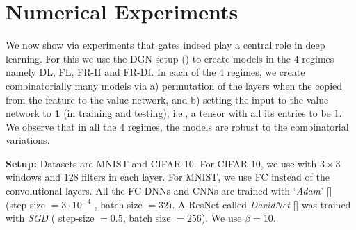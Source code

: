 \section{Numerical Experiments}\label{sec:exp} 
We  now show via experiments that gates indeed play a central role in deep learning. For this we use the DGN setup () to create models in the $4$ regimes namely DL, FL, FR-II and FR-DI. In each of the $4$ regimes, we create  combinatorially many models via a) permutation of the layers when the copied from the feature to the value network, and b) setting the input to the value network to $\mathbf{1}$ (in training and testing), i.e., a tensor with all its entries to be $1$. We observe that in all the $4$ regimes, the models are robust to the combinatorial variations.

\textbf{Setup:} Datasets are MNIST and CIFAR-10. For CIFAR-10, we use  with $3\times 3$  windows and $128$ filters in each layer. For MNIST, we use FC instead of the convolutional layers.  All the FC-DNNs and CNNs are trained with `\emph{Adam}'  [] (step-size $=3\cdot 10^{-4}$ , batch size $=32$). A ResNet called \emph{DavidNet} [] was trained with \emph{SGD} ( step-size $=0.5$, batch size $=256$).  We use $\beta=10$.%

